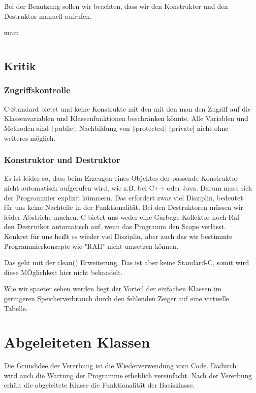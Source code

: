 \documentclass{article}
\newenvironment{code}{\captionsetup{type=listing}}{}
\begin{document}
Bei der Benutzung sollen wir beachten, dass wir den Konstruktor und den Destruktor manuell aufrufen. 

\begin{code}
	\caption{main}
	\inputminted{C}{code/employees/main.c}
\end{code}

\subsection{Kritik}
\subsubsection{Zugriffskontrolle}
C-Standard bietet und keine Konstrukte mit den mit den man den Zugriff auf die Klassenvariablen und Klassenfunktionen beschränken könnte. Alle Variablen und Methoden sind \texttt|public|. Nachbildung von \texttt|protected| \texttt|private| nicht ohne weiteres möglich.
\subsubsection{Konstruktor und Destruktor}
Es ist leider so, dass beim Erzeugen eines Objektes der passende Konstruktor nicht automatisch aufgerufen wird, wie z.B. bei C++ oder Java.
Darum muss sich der Programmier explizit kümmern.
Das erfordert zwar viel Disziplin, bedeutet für uns keine Nachteile in der Funktionalität.
Bei den Destruktoren müssen wir leider Abstriche machen.
C bietet uns weder eine Garbage-Kollektor noch Ruf den Destrutkor automatisch auf, wenn das Programm den Scope verlässt.
Konkret für uns heißt es wieder viel Disziplin, aber auch das wir bestimmte Programmierkonzepte wie "RAII" nicht umsetzen können.

\begin{note}
	Das geht mit der clean() Erweiterung. Das ist aber keine Standard-C, somit wird diese MÖglichkeit hier nicht behandelt.
\end{note}




Wie wir spaeter sehen werden liegt der Vorteil der einfachen Klassen im geringeren Speicherverbrauch durch den fehlenden Zeiger auf eine virtuelle Tabelle.



\section{Abgeleiteten Klassen}
Die Grundidee der Vererbung ist die Wiederverwendung vom Code.
Dadurch wird auch die Wartung der Programme erheblich vereinfacht.
Nach der Vererbung erhält die abgeleitete Klasse die Funktionalität der Basisklasse.
\end{document}
